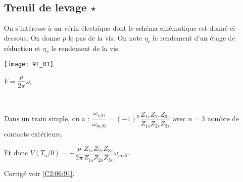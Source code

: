 \normaltrue \difficilefalse \tdifficilefalse
\correctionfalse


\subsection*{Treuil de levage $\star$ \label{C2:06:91}}
\setcounter{question}{0}

\ifcorrection
\else
{}
\fi

\ifprof
\else
On s’intéresse à un vérin électrique dont le schéma cinématique est donné ci-dessous. On donne $p$ le pas de la vis. On note $\eta_r$ le rendement d'un étage de réduction et $\eta_v$ le rendement de la vis.
\begin{center}
\texttt{[image: 91\_01]}
\end{center}


\fi


\ifprof

\begin{corrige}
$V =\dfrac{p}{2\pi} \omega_v$
\end{corrige}
\else
\fi

\ifprof ~\\

\else
\begin{corrige}
Dans un train simple, on a : $\dfrac{\omega_{v/0}}{\omega_{m/0}} = (-1)^n \dfrac{Z_{1e}Z_{2e}Z_{3e}}{Z_{1s}Z_{2s}Z_{3s}}$ avec $n=3$ nombre de contacts extérieurs.

Et donc $V(T_5/0) =-\dfrac{p}{2\pi} \dfrac{Z_{1e}Z_{2e}Z_{3e}}{Z_{1s}Z_{2s}Z_{3s}} \omega_{m/0}$.

\end{corrige}
\fi





\ifprof
\else
\begin{flushright}
\footnotesize{Corrigé  voir \ref{C2:06:91}.}
\end{flushright}%
\fi